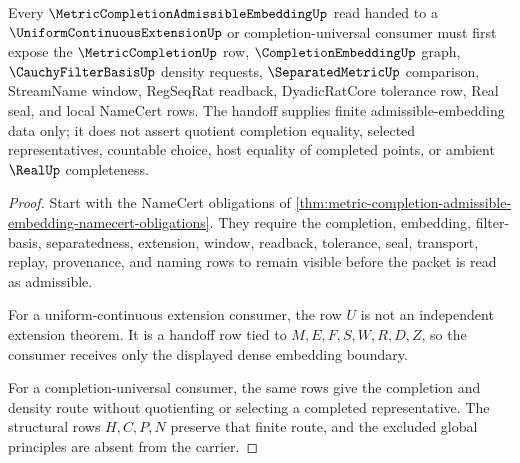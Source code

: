 \begin{theorem}
\label{thm:metric-completion-admissible-embedding-handoff}
Every $\MetricCompletionAdmissibleEmbeddingUp$ read handed to a $\UniformContinuousExtensionUp$ or completion-universal consumer must first expose the $\MetricCompletionUp$ row, $\CompletionEmbeddingUp$ graph, $\CauchyFilterBasisUp$ density requests, $\SeparatedMetricUp$ comparison, StreamName window, RegSeqRat readback, DyadicRatCore tolerance row, Real seal, and local NameCert rows. The handoff supplies finite admissible-embedding data only; it does not assert quotient completion equality, selected representatives, countable choice, host equality of completed points, or ambient $\RealUp$ completeness.
\end{theorem}
\begin{proof}
Start with the NameCert obligations of \autoref{thm:metric-completion-admissible-embedding-namecert-obligations}. They require the completion, embedding, filter-basis, separatedness, extension, window, readback, tolerance, seal, transport, replay, provenance, and naming rows to remain visible before the packet is read as admissible.

For a uniform-continuous extension consumer, the row $U$ is not an independent extension theorem. It is a handoff row tied to $M,E,F,S,W,R,D,Z$, so the consumer receives only the displayed dense embedding boundary.

For a completion-universal consumer, the same rows give the completion and density route without quotienting or selecting a completed representative. The structural rows $H,C,P,N$ preserve that finite route, and the excluded global principles are absent from the carrier.
\end{proof}



